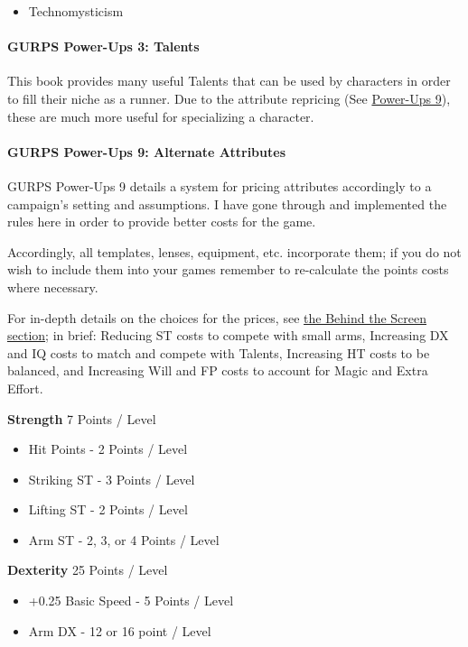 \begin{multicols*}{3}
	\begin{itemize}
		\itemsep 0pt
		\item Technomysticism
	\end{itemize}
	
	\paragraph{GURPS Power-Ups 3: Talents}
	This book provides many useful Talents that can be used by characters in order to fill their niche as a runner. Due to the attribute repricing (See \hyperref[PU9]{Power-Ups 9}), these are much more useful for specializing a character.
	
	\paragraph{GURPS Power-Ups 9: Alternate Attributes \label{PU9}}
	GURPS Power-Ups 9 details a system for pricing attributes accordingly to a campaign's setting and assumptions. I have gone through and implemented the rules here in order to provide better costs for the game. 
	
	Accordingly, all templates, lenses, equipment, etc. incorporate them; if you do not wish to include them into your games remember to re-calculate the points costs where necessary.
	
	For in-depth details on the choices for the prices, see \hyperref[behind_the_screen]{the Behind the Screen section}; in brief: Reducing ST costs to compete with small arms, Increasing DX and IQ costs to match and compete with Talents, Increasing HT costs to be balanced, and Increasing Will and FP costs to account for Magic and Extra Effort.
	
	\noindent\textbf{Strength}
	7 Points / Level
	
	\begin{itemize}
		\itemsep0em 
		\item Hit Points - 2 Points / Level
		\item Striking ST - 3 Points / Level
		\item Lifting ST - 2 Points / Level
		\item Arm ST - 2, 3, or 4 Points / Level
	\end{itemize}
	
	\noindent\textbf{Dexterity}
	25 Points / Level
	
	\begin{itemize}
		\itemsep0em 
		\item +0.25 Basic Speed - 5 Points / Level
		\item Arm DX - 12 or 16 point / Level
	\end{itemize}
	

\end{multicols*}
